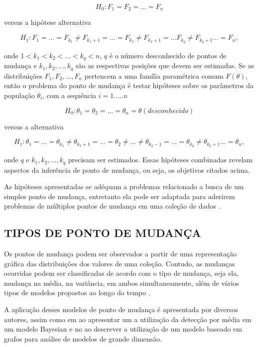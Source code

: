 \[H_0 : F_1 = F_2 = ... = F_n\]

versus a hipótese alternativa

\[H_{1} : F_{1} = ... = F_{k_1}\neq F_{{k_1}+1} = ... = F_{k_2}\neq F_{{k_2}+1} = ... F_{k_q}\neq F_{{k_q}+1} ... = F_{n},\]

onde $1 < k_1 < k_2 < ... < k_q <n$, $q$ é o número desconhecido de pontos de mudança e $k_1, k_2, ..., k_q$ são as respectivas posições que devem ser estimadas. Se as distribuições $F_1, F_2, ..., F_n$ pertencem a uma família paramétrica comum $F(\theta)$, 
então o problema do ponto de mudança é testar hipóteses sobre os parâmetros da população $\theta_i$, com a sequência $i = 1 ..... n$

\[H_0 : \theta_{1} = \theta_{2} = ... = \theta_{n} = \theta (desconhecido)\]

versus a alternativa

\[H_1 : \theta_{1} = ... = \theta_{k_1} \not = \theta_{{k_1}+1} = ... = \theta_{2} \not = ... \not = \theta_{{k_q}-1} = ... = \theta_{k_q} \not = \theta_{{k_q}+1}... = \theta_{n},\]

onde $q$ e $k_1, k_2, ..., k_q$ precisam ser estimados. Essas hipóteses combinadas revelam aspectos da inferência de ponto de mudança, ou seja, os objetivos citados acima. 

As hipóteses apresentadas se adéquam a problemas relacionado a busca de um simples ponto de mudança, entretanto ela pode ser adaptada para aderirem problemas de múltiplos pontos de mudança em uma coleção de dados \cite{Chen1-2000}. 

\subsection{TIPOS DE PONTO DE MUDANÇA} 

Os pontos de mudança podem ser observados a partir de uma representação gráfica das distribuições dos valores de uma coleção. Contudo, as mudanças ocorridas podem ser classificadas de acordo com o tipo de mudança, seja ela, mudança na média, na variância, em ambos simultaneamente, além de vários tipos de modelos propostos ao longo do tempo \cite{Chen2-2000}. 

A aplicação desses modelos de ponto de mudança é apresentada por diversos autores, assim como em \cite{Cheon2010} ao apresentar um a utilização da detecção por média em um modelo Bayesian e no \cite{Shi2017} ao descrever a utilização de um modelo baseado em grafos para análise de modelos de grande dimensão. 


